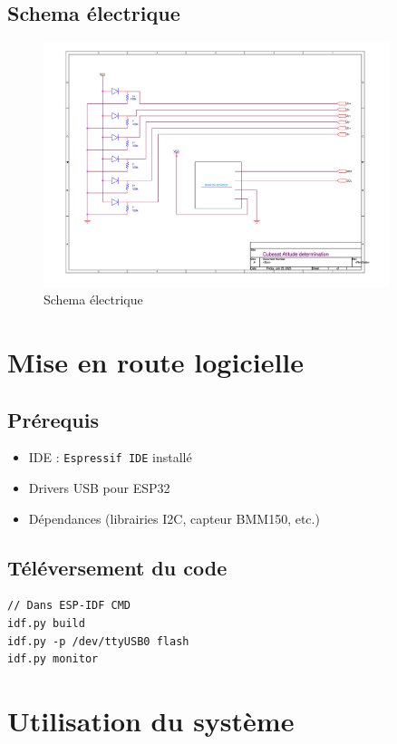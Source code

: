 \documentclass[a4paper,12pt]{article}
\begin{document}
\subsection{Schema électrique}
\begin{figure}[H]  %
    \centering
    \includegraphics[width=0.9\textwidth]{fig/cubesatSchematic.png}
    \caption{Schema électrique}
    \label{fig:Schema électrique}
\end{figure}

\section{Mise en route logicielle}
\subsection{Prérequis}
\begin{itemize}
    \item IDE : \texttt{Espressif IDE} installé
    \item Drivers USB pour ESP32
    \item Dépendances (librairies I2C, capteur BMM150, etc.)
\end{itemize}

\subsection{Téléversement du code}
\begin{lstlisting}
// Dans ESP-IDF CMD
idf.py build
idf.py -p /dev/ttyUSB0 flash
idf.py monitor
\end{lstlisting}

\section{Utilisation du système}
\end{document}
